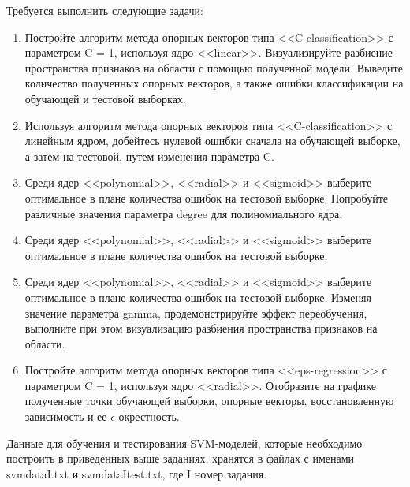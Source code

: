 \documentclass[]{article}
\numberwithin{equation}{section}
\begin{document}
    Требуется выполнить следующие задачи:
    \begin{enumerate}
        \item Постройте алгоритм метода опорных векторов типа <<C-classification>> с параметром C = 1, используя ядро <<linear>>. Визуализируйте разбиение пространства признаков на области с помощью полученной модели. Выведите количество полученных опорных векторов, а также ошибки классификации на обучающей и тестовой выборках.
        \item Используя алгоритм метода опорных векторов типа <<C-classification>> с линейным ядром, добейтесь нулевой ошибки сначала на обучающей выборке, а затем на тестовой, путем изменения параметра C.
        \item Среди ядер <<polynomial>>, <<radial>> и <<sigmoid>> выберите оптимальное в плане количества ошибок на тестовой выборке. Попробуйте различные значения параметра degree для полиномиального ядра.
        \item Среди ядер <<polynomial>>, <<radial>> и <<sigmoid>> выберите оптимальное в плане количества ошибок на тестовой выборке.
        \item Среди ядер <<polynomial>>, <<radial>> и <<sigmoid>> выберите оптимальное в плане количества ошибок на тестовой выборке. Изменяя значение параметра gamma, продемонстрируйте эффект переобучения, выполните при этом визуализацию разбиения пространства признаков на области.
        \item Постройте алгоритм метода опорных векторов типа <<eps-regression>> с параметром C = 1, используя ядро <<radial>>. Отобразите на графике полученные точки обучающей выборки, опорные векторы, восстановленную зависимость и ее $\epsilon$-окрестность.
    \end{enumerate}

    Данные для обучения и тестирования SVM-моделей, которые необходимо построить в приведенных выше заданиях, хранятся в файлах с именами svmdataI.txt и svmdataItest.txt, где I номер задания.

    \newpage
\end{document}

